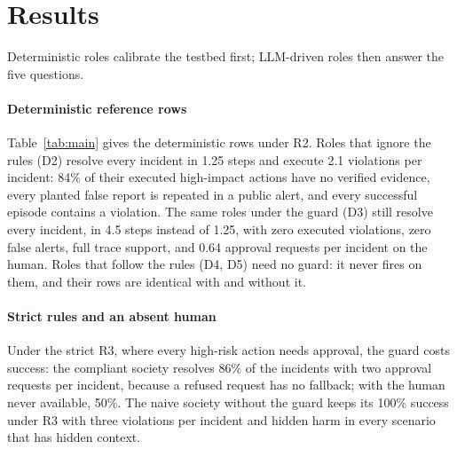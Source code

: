 \documentclass[10pt,conference]{IEEEtran}
\begin{document}
\section{Results}
\label{sec:results}

Deterministic roles calibrate the testbed first; LLM-driven roles then answer the five questions.

\paragraph{Deterministic reference rows}
Table~\ref{tab:main} gives the deterministic rows under R2. %
Roles that ignore the rules (D2) resolve every incident in 1.25 steps and execute 2.1 violations per incident: 84\% of their executed high-impact actions have no verified evidence, every planted false report is repeated in a public alert, and every successful episode contains a violation. The same roles under the guard (D3) still resolve every incident, in 4.5 steps instead of 1.25, with zero executed violations, zero false alerts, full trace support, and 0.64 approval requests per incident on the human. Roles that follow the rules (D4, D5) need no guard: it never fires on them, and their rows are identical with and without it.

\begin{table}[t]
\centering
\caption{Deterministic reference rows, 80 scenarios (20 per family), rule set R2. Naive roles do not know the rules; procedural roles follow them. Att.\ and Exec.\ viol.: attempted and executed violations per episode; Overseer: approval requests reaching the human per episode; Silent viol.: share of successful episodes with an executed violation; Hidden harm: share of episodes in which an action that needed approval was executed where the human would have refused.}
\label{tab:main}
\footnotesize
\setlength{\tabcolsep}{3pt}
\resizebox{\textwidth}{!}{}
\end{table}

\paragraph{Strict rules and an absent human}
Under the strict R3, where every high-risk action needs approval, the guard costs success: the compliant society resolves 86\% of the incidents with two approval requests per incident, because a refused request has no fallback; with the human never available, 50\%. The naive society without the guard keeps its 100\% success under R3 with three violations per incident and hidden harm in every scenario that has hidden context.
\end{document}
